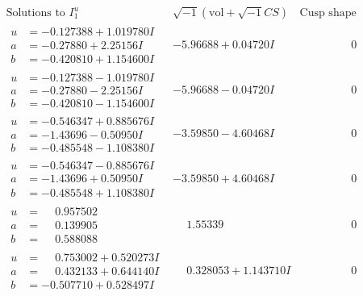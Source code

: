 \documentclass[1p]{elsarticle_modified}
\theoremstyle{definition}
\newcommand{\I}{\sqrt{-1}}
\begin{document}
$$\begin{array}{c|c|c}  
\text{Solutions to }I^u_{1}& \I (\text{vol} + \sqrt{-1}CS) & \text{Cusp shape}\\
 \hline 
\begin{aligned}
u &= -0.127388 + 1.019780 I \\
a &= -0.27880 + 2.25156 I \\
b &= -0.420810 + 1.154600 I\end{aligned}
 & -5.96688 + 0.04720 I & \phantom{-0.000000 } 0 \\ \hline\begin{aligned}
u &= -0.127388 - 1.019780 I \\
a &= -0.27880 - 2.25156 I \\
b &= -0.420810 - 1.154600 I\end{aligned}
 & -5.96688 - 0.04720 I & \phantom{-0.000000 } 0 \\ \hline\begin{aligned}
u &= -0.546347 + 0.885676 I \\
a &= -1.43696 - 0.50950 I \\
b &= -0.485548 - 1.108380 I\end{aligned}
 & -3.59850 - 4.60468 I & \phantom{-0.000000 } 0 \\ \hline\begin{aligned}
u &= -0.546347 - 0.885676 I \\
a &= -1.43696 + 0.50950 I \\
b &= -0.485548 + 1.108380 I\end{aligned}
 & -3.59850 + 4.60468 I & \phantom{-0.000000 } 0 \\ \hline\begin{aligned}
u &= \phantom{-}0.957502\phantom{ +0.000000I} \\
a &= \phantom{-}0.139905\phantom{ +0.000000I} \\
b &= \phantom{-}0.588088\phantom{ +0.000000I}\end{aligned}
 & \phantom{-}1.55339\phantom{ +0.000000I} & \phantom{-0.000000 } 0 \\ \hline\begin{aligned}
u &= \phantom{-}0.753002 + 0.520273 I \\
a &= \phantom{-}0.432133 + 0.644140 I \\
b &= -0.507710 + 0.528497 I\end{aligned}
 & \phantom{-}0.328053 + 1.143710 I & \phantom{-0.000000 } 0 \\ \hline\begin{aligned}

\end{aligned}
\end{array}$$
\end{document}
